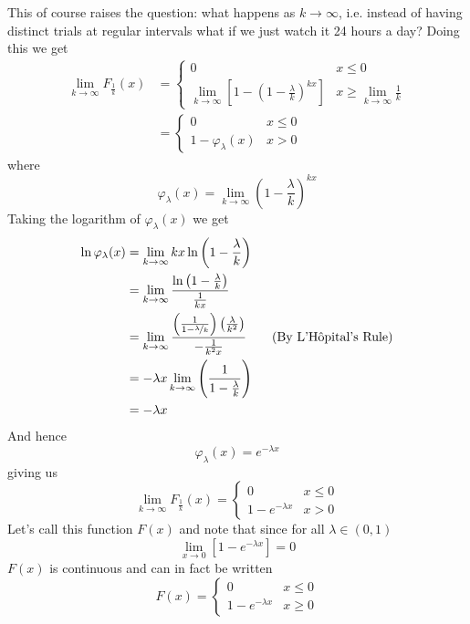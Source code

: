 This of course raises the question: what happens as $k\to\infty$, i.e. instead of having distinct trials at regular intervals what if we just watch it 24 hours a day? Doing this we get
\begin{align*}
    \lim_{k\to\infty} F_{\frac 1k}(x) 
    &= 
    \begin{cases}
        0 & x \le 0
        \\
        \displaystyle\lim_{k\to\infty}\left[1-\left(1-\frac \lambda k\right)^{kx}\right] & x\ge \displaystyle\lim_{k\to\infty}\tfrac 1k
    \end{cases}
    \\
    &= 
    \begin{cases}
        0 & x \le 0
        \\
        1-\varphi_\lambda(x) & x > 0
    \end{cases}
\end{align*}
where 
\[
    \varphi_\lambda(x) =\displaystyle\lim_{k\to\infty} \left(1-\frac \lambda k\right)^{kx}
\]
Taking the logarithm of $\varphi_\lambda(x)$ we get
\begin{align*}
    \ln\varphi_\lambda(x) & = \lim_{k\to\infty} kx\ln\left(1-\frac \lambda k\right)
    \\              & = \lim_{k\to\infty} \frac{\ln\left(1-\frac \lambda k\right)}{\frac 1 {kx}}
    \\              & = \lim_{k\to\infty} \frac{\left(\frac 1{1-\nicefrac \lambda k}\right)\left(\frac \lambda {k^2}\right)}{-\frac 1 {k^2 x}} \tag{By L'H${\hat{\textup o}}$pital's Rule}
    \\              & = -\lambda x\lim_{k\to\infty} \left(\frac 1 {1-\frac \lambda k}\right)
    \\              & = -\lambda x
\end{align*}
And hence
\[
    \varphi_\lambda(x)=e^{-\lambda x}
\]
giving us
\[
    \lim_{k\to\infty} F_{\frac 1k}(x) = 
    \begin{cases}
        0 & x \le 0
        \\
        1-e^{-\lambda x} & x > 0
    \end{cases}
\]
Let's call this function $F(x)$ and note that since for all $\lambda \in (0,1)$
\[
    \lim_{x\to 0} \left[1-e^{-\lambda x}\right]=0 
\]
$F(x)$ is continuous and can in fact be written
\[
    F(x) = 
    \begin{cases}
        0 & x \le 0
        \\
        1-e^{-\lambda x} & x \ge 0
    \end{cases}
\]
